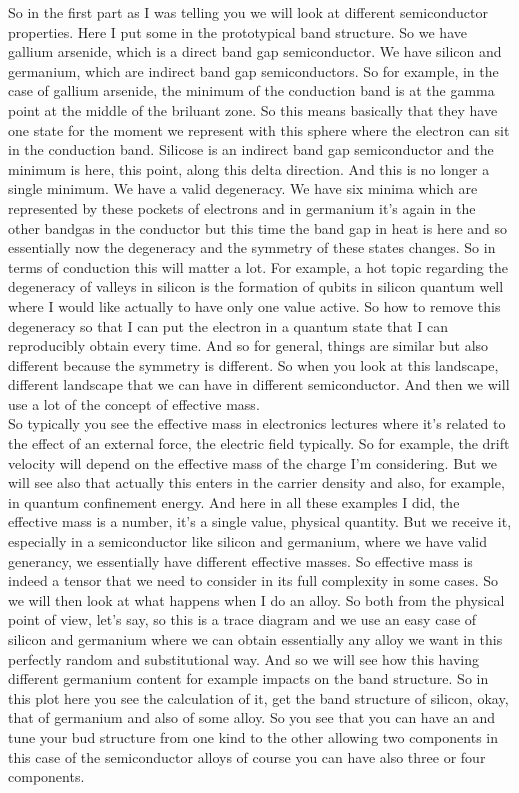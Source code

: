 So in the first part as I was telling you we will look at different semiconductor properties. Here I put some in the prototypical band structure. So we have gallium arsenide, which is a direct band gap semiconductor. We have silicon and germanium, which are indirect band gap semiconductors. So for example, in the case of gallium arsenide, the minimum of the conduction band is at the gamma point at the middle of the briluant zone. So this means basically that they have one state for the moment we represent with this sphere where the electron can sit in the conduction band. Silicose is an indirect band gap semiconductor and the minimum is here, this point, along this delta direction. And this is no longer a single minimum. We have a valid degeneracy. We have six minima which are represented by these pockets of electrons and in germanium it's again in the other bandgas in the conductor but this time the band gap in heat is here and so essentially now the degeneracy and the symmetry of these states changes. So in terms of conduction this will matter a lot. For example, a hot topic regarding the degeneracy of valleys in silicon is the formation of qubits in silicon quantum well where I would like actually to have only one value active. So how to remove this degeneracy so that I can put the electron in a quantum state that I can reproducibly obtain every time. And so for general, things are similar but also different because the symmetry is different. So when you look at this landscape, different landscape that we can have in different semiconductor. And then we will use a lot of the concept of effective mass.\\
So typically you see the effective mass in electronics lectures where it's related to the effect of an external force, the electric field typically. So for example, the drift velocity will depend on the effective mass of the charge I'm considering. But we will see also that actually this enters in the carrier density and also, for example, in quantum confinement energy. And here in all these examples I did, the effective mass is a number, it's a single value, physical quantity. But we receive it, especially in a semiconductor like silicon and germanium, where we have valid generancy, we essentially have different effective masses. So effective mass is indeed a tensor that we need to consider in its full complexity in some cases.
So we will then look at what happens when I do an alloy. So both from the physical point of view, let's say, so this is a trace diagram and we use an easy case of silicon and germanium where we can obtain essentially any alloy we want in this perfectly random and substitutional way. And so we will see how this having different germanium content for example impacts on the band structure. So in this plot here you see the calculation of it, get the band structure of silicon, okay, that of germanium and also of some alloy. So you see that you can have an and tune your bud structure from one kind to the other allowing two components in this case of the semiconductor alloys of course you can have also three or four components.\\
